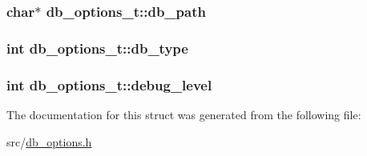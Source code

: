 \hypertarget{structdb__options__t_a419cca85c72e1fcafb80864cfb3920eb}{
\subsubsection[{db\-\_\-path}]{\setlength{\rightskip}{0pt plus 5cm}char$\ast$ db\-\_\-options\-\_\-t\-::db\-\_\-path}}\label{d2/dbc/structdb__options__t_a419cca85c72e1fcafb80864cfb3920eb}
\hypertarget{structdb__options__t_a456a3e579029a0b71e7bfc33daa38d08}{
\subsubsection[{db\-\_\-type}]{\setlength{\rightskip}{0pt plus 5cm}int db\-\_\-options\-\_\-t\-::db\-\_\-type}}\label{d2/dbc/structdb__options__t_a456a3e579029a0b71e7bfc33daa38d08}
\hypertarget{structdb__options__t_a35aba110fe5576aedd07c3260df94893}{
\subsubsection[{debug\-\_\-level}]{\setlength{\rightskip}{0pt plus 5cm}int db\-\_\-options\-\_\-t\-::debug\-\_\-level}}\label{d2/dbc/structdb__options__t_a35aba110fe5576aedd07c3260df94893}


The documentation for this struct was generated from the following file\-:\begin{DoxyCompactItemize}
\item 
src/\hyperlink{db__options_8h}{db\-\_\-options.\-h}\end{DoxyCompactItemize}
